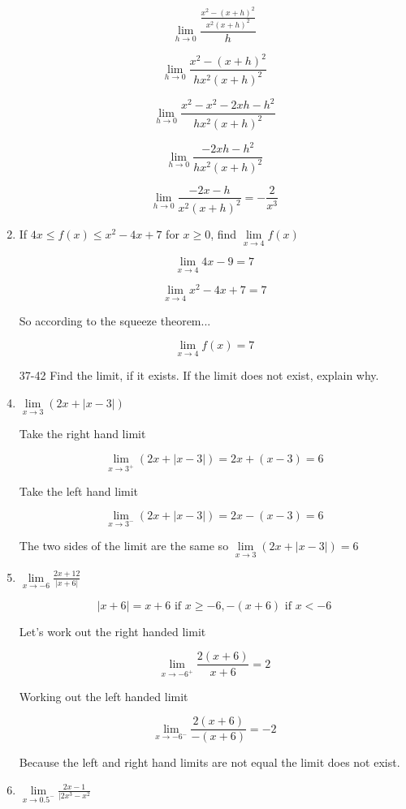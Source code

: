 \documentclass{article}
\begin{document}
\begin{enumerate}
			$$\lim \limits _{h \to 0} \frac{\frac{x^2 - (x+h)^2}{x^2(x+h)^2}}{h}$$

			$$\lim \limits _{h \to 0} \frac{x^2 - (x+h)^2}{hx^2(x+h)^2}$$

			$$\lim \limits _{h \to 0} \frac{x^2-x^2 -2xh - h^2}{hx^2(x+h)^2}$$

			$$\lim \limits _{h \to 0} \frac{-2xh-h^2}{hx^2(x+h)^2}$$

			$$\lim \limits _{h \to 0} \frac{-2x-h}{x^2(x+h)^2} = -\frac{2}{x^3}$$

		\item If $4x \leq f(x) \leq x^2 - 4x + 7$ for $x \geq 0$, find $\lim \limits _{x \to 4} f(x)$

			$$\lim \limits _{x \to 4} 4x - 9 = 7$$

			$$\lim \limits _{x \to 4} x^2 - 4x + 7 = 7$$

			So according to the squeeze theorem...

			$$\lim \limits _{x \to 4} f(x) = 7$$

		\item[37-42] Find the limit, if it exists. If the limit does not exist, explain why.

		\item $\lim \limits _{x \to 3} (2x + |x-3|)$

			Take the right hand limit

			$$\lim \limits _{x \to 3^{+}} (2x + |x-3|) = 2x + (x-3) = 6$$

			Take the left hand limit

			$$\lim \limits _{x \to 3^{-}} (2x + |x-3|) = 2x - (x-3) = 6$$

			The two sides of the limit are the same so $\lim \limits _{x \to 3} (2x + |x-3|) = 6$

		\item $\lim \limits _{x \to -6} \frac{2x+12}{|x+6|}$

			$$|x+6| = x+6 \text{ if } x \geq -6, -(x+6) \text{ if } x < -6$$

			Let's work out the right handed limit


			$$\lim \limits _{x \to -6^{+}} \frac{2(x+6)}{x+6} = 2$$

			Working out the left handed limit

			$$\lim \limits _{x \to -6^{-}} \frac{2(x+6)}{-(x+6)} = -2$$

			Because the left and right hand limits are not equal the limit does not exist.

		\item $\lim \limits _{x \to 0.5^{-}} \frac{2x-1}{|2x^3-x^2}$


\end{enumerate}
\end{document}
